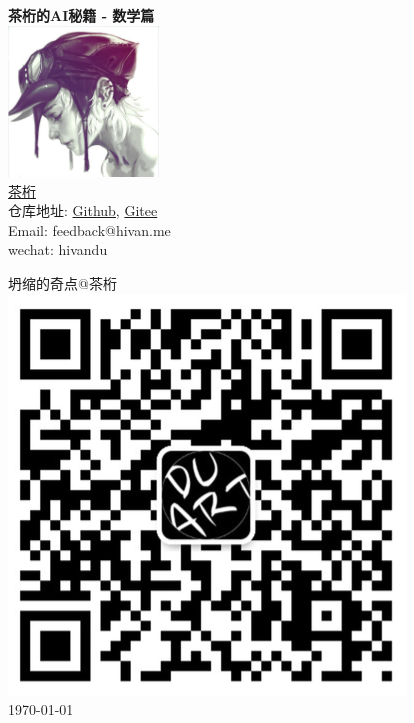 \begin{titlepage}
  \centering
  \Huge\textbf{茶桁的AI秘籍 - 数学篇} \\
  \vspace*{1cm}
  \includegraphics[width=0.3\textwidth]{logo.png} \\ %
  \vspace*{0.5cm}
  \small{\href{https://hivan.me}{茶桁}} \\
  \vspace*{1cm}
  \small{仓库地址: \href{https://github.com/hivandu/AI_Cheats}{Github}, \href{https://gitee.com/hivandu/ai_cheats}{Gitee}} \\
  \vspace*{0.2cm}
  \small{Email: feedback@hivan.me} \\
  \vspace*{0.2cm}
  \small{wechat: hivandu} \\
  \vspace{1cm}
  \vfill
  \hfill %
  \begin{minipage}[h]{0.2\textwidth}%
    \centering
    \small{坍缩的奇点@茶桁} \\
    \vspace{0.2em}
    \includegraphics[width=\textwidth]{publisher.png} \\ %
    \vspace{1em}
    \small\today %
  \end{minipage}
\end{titlepage}
